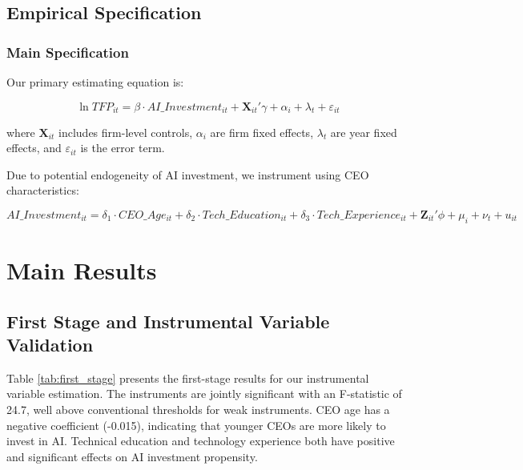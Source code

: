 \documentclass[12pt]{article}
\begin{document}
\subsection{Empirical Specification}

\subsubsection{Main Specification}

Our primary estimating equation is:

\begin{equation}
\ln TFP_{it} = \beta \cdot AI\_Investment_{it} + \mathbf{X}_{it}'\gamma + \alpha_i + \lambda_t + \varepsilon_{it}
\end{equation}

where $\mathbf{X}_{it}$ includes firm-level controls, $\alpha_i$ are firm fixed effects, $\lambda_t$ are year fixed effects, and $\varepsilon_{it}$ is the error term.

Due to potential endogeneity of AI investment, we instrument using CEO characteristics:

\begin{equation}
AI\_Investment_{it} = \delta_1 \cdot CEO\_Age_{it} + \delta_2 \cdot Tech\_Education_{it} + \delta_3 \cdot Tech\_Experience_{it} + \mathbf{Z}_{it}'\phi + \mu_i + \nu_t + u_{it}
\end{equation}

\section{Main Results}

\subsection{First Stage and Instrumental Variable Validation}

Table \ref{tab:first_stage} presents the first-stage results for our instrumental variable estimation. The instruments are jointly significant with an F-statistic of 24.7, well above conventional thresholds for weak instruments. CEO age has a negative coefficient (-0.015), indicating that younger CEOs are more likely to invest in AI. Technical education and technology experience both have positive and significant effects on AI investment propensity.
\end{document}
